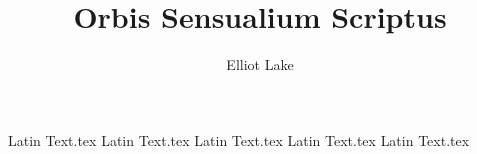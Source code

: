 \documentclass[11pt]{book}
\author{Elliot Lake}
\title{Orbis Sensualium Scriptus}
\begin{document}
\maketitle 
\tableofcontents

{Latin Text.tex}
{Latin Text.tex}
{Latin Text.tex}
{Latin Text.tex}
{Latin Text.tex}
\end{document}
